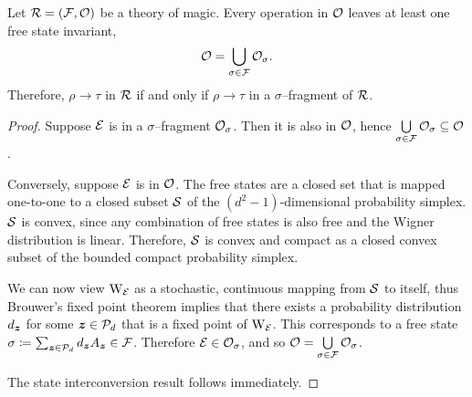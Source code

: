 \documentclass[pra,
aps,
twocolumn,
superscriptaddress,
groupedaddress,
nofootinbib,
reprint
]{revtex4-1}
\begin{document}
\begin{theorem}
    Let $\R = (\F, \O)$ be a theory of magic.
    Every operation in $\O$ leaves at least one free state invariant,
  \begin{equation}
\O = \bigcup\limits_{\sigma \in \F} \O_\sigma.
\end{equation}
Therefore, $\rho \longrightarrow \tau$ in $\R$ if and only if $\rho \longrightarrow \tau$ in a $\sigma$--fragment of $\R$.
\end{theorem}
\begin{proof}
    Suppose $\E$ is in a $\sigma$--fragment $\O_\sigma$.
    Then it is also in $\O$, hence $\bigcup\limits_{\sigma \in \F} \O_\sigma \subseteq \O$. 
    
    Conversely, suppose $\E$ is in $\O$. 
    The free states are a closed set that is mapped one-to-one to a closed subset $\cal{S}$ of the $(d^2 - 1)$-dimensional probability simplex.
    $\cal{S}$ is convex, since any combination of free states is also free and the Wigner distribution is linear.
    Therefore, $\cal{S}$ is convex and compact as a closed convex subset of the bounded compact probability simplex.
    
    We can now view $\W{\E}$ as a stochastic, continuous mapping from $\cal{S}$ to itself, thus Brouwer's fixed point theorem  implies that there exists a probability distribution $d_{\bmz}$ for some $ \bmz \in \cal{P}_d$ that is a fixed point of $\W{\E}$.
    This corresponds to a free state $\sigma \coloneqq \sum_{\bmz \in \cal{P}_d} d_{\bmz} A_{\bmz} \in \F$. 
    Therefore $\E \in \O_\sigma$, and so $\O = \bigcup\limits_{\sigma \in \F} \O_\sigma$. 
    
    The state interconversion result follows immediately.
\end{proof}
\end{document}
